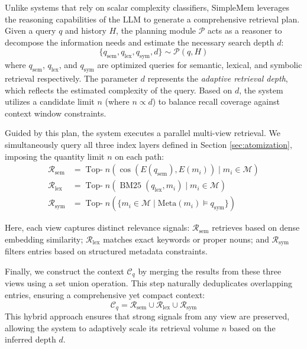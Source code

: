 \documentclass{article}
\theoremstyle{plain}
\theoremstyle{definition}
\theoremstyle{remark}
\begin{document}
Unlike systems that rely on scalar complexity classifiers, SimpleMem leverages the reasoning capabilities of the LLM to generate a comprehensive retrieval plan. Given a query $q$ and history $H$, the planning module $\mathcal{P}$ acts as a reasoner to decompose the information needs and estimate the necessary search depth $d$:
\begin{equation}
    \{ q_{\text{sem}}, q_{\text{lex}}, q_{\text{sym}}, d \} \sim \mathcal{P}(q, H)
\end{equation}
where $q_{\text{sem}}$, $q_{\text{lex}}$, and $q_{\text{sym}}$ are optimized queries for semantic, lexical, and symbolic retrieval respectively. The parameter $d$ represents the \textit{adaptive retrieval depth}, which reflects the estimated complexity of the query. Based on $d$, the system utilizes a candidate limit $n$ (where $n \propto d$) to balance recall coverage against context window constraints.

Guided by this plan, the system executes a parallel multi-view retrieval. We simultaneously query all three index layers defined in Section \ref{sec:atomization}, imposing the quantity limit $n$ on each path:
\begin{equation}
    \begin{aligned}
    \mathcal{R}_{\text{sem}} &= \operatorname{Top-}n(\cos(E(q_{\text{sem}}), E(m_i)) \mid m_i \in \mathcal{M}) \\
    \mathcal{R}_{\text{lex}} &= \operatorname{Top-}n(\operatorname{BM25}(q_{\text{lex}}, m_i) \mid m_i \in \mathcal{M}) \\
    \mathcal{R}_{\text{sym}} &= \operatorname{Top-}n(\{ m_i \in \mathcal{M} \mid \text{Meta}(m_i) \models q_{\text{sym}} \})
    \end{aligned}
\end{equation}

Here, each view captures distinct relevance signals: $\mathcal{R}_{\text{sem}}$ retrieves based on dense embedding similarity; $\mathcal{R}_{\text{lex}}$ matches exact keywords or proper nouns; and $\mathcal{R}_{\text{sym}}$ filters entries based on structured metadata constraints.

Finally, we construct the context $\mathcal{C}_{q}$ by merging the results from these three views using a set union operation. This step naturally deduplicates overlapping entries, ensuring a comprehensive yet compact context:
\begin{equation}
\mathcal{C}_{q} = \mathcal{R}_{\text{sem}} \cup \mathcal{R}_{\text{lex}} \cup \mathcal{R}_{\text{sym}}
\end{equation}
This hybrid approach ensures that strong signals from any view are preserved, allowing the system to adaptively scale its retrieval volume $n$ based on the inferred depth $d$.
\end{document}
